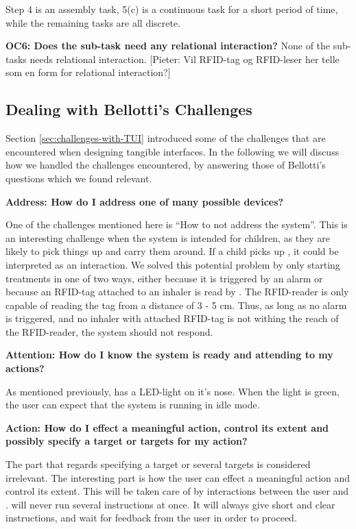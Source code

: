 Step 4 is an assembly task, 5(c) is a continuous task for a short period of time, while the remaining tasks are all discrete.  

\textbf{OC6: Does the sub-task need any relational interaction?}
None of the sub-tasks needs relational interaction.
[Pieter: Vil RFID-tag og RFID-leser her telle som en form for relational interaction?]
 
\subsection{Dealing with Bellotti's Challenges}
\label{sec:dealingwithbellotti}

Section \ref{sec:challenges-with-TUI} introduced some of the challenges that are encountered when designing tangible interfaces. In the following we will discuss how we handled the challenges encountered, by answering those of Bellotti's questions which we found relevant. 

\textbf{Address: How do I address one of many possible devices?}

One of the challenges mentioned here is ``How to not address the system''. This is an interesting challenge when the system is intended for children, as they are likely to pick things up and carry them around. If a child picks up \ab{}, it could be interpreted as an interaction. We solved this potential problem by only starting treatments in one of two ways, either because it is triggered by an alarm or because an RFID-tag attached to an inhaler is read by \ab{}. The RFID-reader is only capable of reading the tag from a distance of 3 - 5 cm. Thus, as long as no alarm is triggered, and no inhaler with attached RFID-tag is not withing the reach of the RFID-reader, the system should not respond.  


\textbf{Attention: How do I know the system is ready and attending to my actions?}

As mentioned previously, \buddy{} has a LED-light on it's nose. When the light is green, the user can expect that the system is running in idle mode. 

\textbf{Action: How do I effect a meaningful action, control its extent and possibly specify a target or targets for my action?}

The part that regards specifying a target or several targets is considered irrelevant. The interesting part is how the user can effect a meaningful action and control its extent. This will be taken care of by interactions between the user and \buddy{}. \buddy{} will never run several instructions at once. It will always give short and clear instructions, and wait for feedback from the user in order to proceed. 

